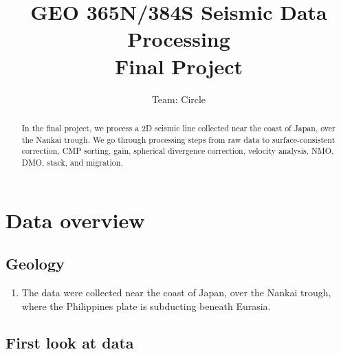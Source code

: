 \author{Team: Circle}
\title{GEO 365N/384S Seismic Data Processing \\ Final Project}

\begin{abstract}

In the final project, we process a 2D seismic line collected near the coast of Japan, over the Nankai trough. We go through processing steps from raw data to surface-consistent correction, CMP sorting, gain, spherical divergence correction, velocity analysis, NMO, DMO, stack, and migration.
  
\end{abstract}

\section{Data overview}

\subsection{Geology}

\begin{enumerate}
\item The data were collected near the coast of Japan, over the Nankai trough, where the Philippines plate is subducting beneath Eurasia.
\end{enumerate}

\subsection{First look at data}

